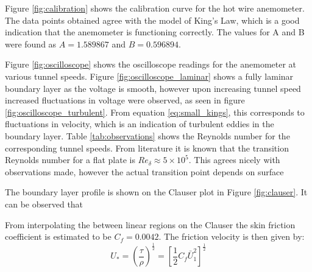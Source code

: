 \documentclass{article}
\begin{document}

Figure \ref{fig:calibration} shows the calibration curve for the hot wire anemometer.
The data points obtained agree with the model of King's Law, which is a good indication that the anemometer is functioning correctly.
The values for A and B were found as $A	= 1.589867$ and $B	= 0.596894$.


Figure \ref{fig:oscilloscope} shows the oscilloscope readings for the anemometer at various tunnel speeds.
Figure \ref{fig:oscilloscope_laminar} shows a fully laminar boundary layer as the voltage is smooth, 
however upon increasing tunnel speed increased fluctuations in voltage were observed, as seen in figure \ref{fig:oscilloscope_turbulent}.
From equation \ref{eq:small_kings}, this corresponds to fluctuations in velocity, which is an indication of turbulent eddies in the boundary layer.
Table \ref{tab:observations} shows the Reynolds number for the corresponding tunnel speeds.
From literature it is known that the transition Reynolds number for a flat plate is $Re_{\delta} \approx 5 \times 10^5$.
This agrees nicely with observations made, however the actual transition point depends on surface 








The boundary layer profile is shown on the Clauser plot in Figure \ref{fig:clauser}.
It can be observed that

From interpolating the between linear regions on the Clauser the skin friction coefficient is estimated to be $C_f = 0.0042$.
The friction velocity is then given by:
\begin{equation}
    U_* = \left( \frac{\tau}{\rho} \right)^{\frac{1}{2}} = \left[ \frac{1}{2}C_f \bar{ U}_1^2 \right]^{\frac{1}{2}}
\end{equation}
\end{document}
